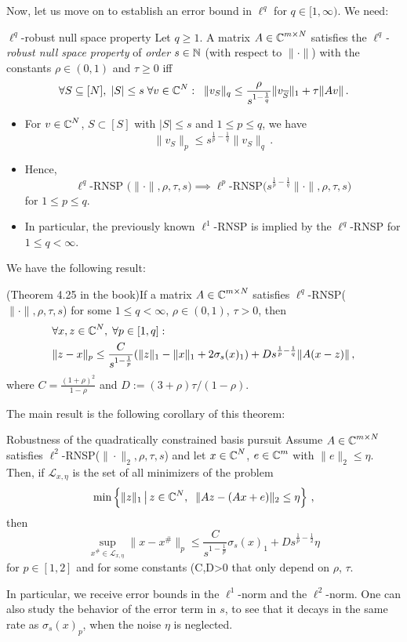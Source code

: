 \documentclass[a4paper]{article}
\begin{document}
    Now, let us move on to establish an error bound in \(\ell^q\) for \(q\in [1,\infty)\). We need:
    \begin{Def*}
 {$\ell^q$-robust null space property}{}
 Let \(q\ge 1\). A matrix \(A\in \operatorname{\mathbb C}^{m\times N}\) satisfies the \emph{$\ell^q$-robust null space property} of \emph{order} \(s\in \operatorname{\mathbb N}\) (with respect to \(\|\cdot\|\)) with the constants \(\rho\in (0,1)\) and \(\tau\ge0\) iff
 \[\forall S\subseteq [N],\;|S|\le s\;\forall v\in \operatorname{\mathbb C}^N:\;\;\|v_S\|_q\le \frac{\rho}{s^{1-\frac{1}{q}}}\|v_{\overline S}\|_1+\tau\|Av\|\,.\]
 \end{Def*}
 \begin{Bemerkung*}{}{}
     \begin{itemize}
		\item For \(v\in \operatorname{\mathbb C}^N \), \(S\subset [S]\) with \(|S|\le s\) and \(1\le p\le q\), we have 
		\[\|v_S\|_p\le s^{\frac{1}{p}-\frac{1}{q}}\|v_S\|_q\,.\]
		\item Hence, 
		\[
		\ell^q
		\text{-RNSP
		($\|\cdot\|,\rho,\tau,s$)}
		\implies \ell^p \text{-RNSP($s^{\frac{1}{p}-\frac{1}{q}}\|\cdot\|,\rho,\tau,s$)}
		\]
        for \(1\le p\le q\).
		\item In particular, the previously known \(\ell^1\)-RNSP is implied by the \(\ell^q\)-RNSP for \(1\le q<\infty\).
	\end{itemize}
 \end{Bemerkung*}    

 We have the following result:
 \begin{Satz*}
		{(Theorem 4.25 in the book)}{}If a matrix \(A\in \operatorname{\mathbb C}^{m\times N}\) satisfies \(\ell^q\)-RNSP($\|\cdot\|,\rho,\tau,s$) for some \(1\le q<\infty\), \(\rho\in (0,1)\), \(\tau>0\), then
		\begin{align*}
			&\forall x,z\in \operatorname{\mathbb C}^N,\;\forall p\in [1,q]:\\
			&\|z-x\|_p\le \frac{C}{s^{1-\frac{1}{p}}}(\|z\|_1-\|x\|_1+2\sigma_s(x)_1)+Ds^{\frac{1}{p}-\frac{1}{q}}\|A(x-z)\|\,,\\
		\end{align*}
		where \(C=\frac{(1+\rho)^2}{1-\rho}\) and \(D:=(3+\rho)\tau/(1-\rho)\).
	\end{Satz*}

   The main result is the following corollary of this theorem:
   \begin{Kor*}
		{Robustness of the quadratically constrained basis pursuit}{}
		Assume \(A\in \operatorname{\mathbb C}^{m\times N }\) satisfies \(\ell^2 \)-RNSP($\|\cdot\|_2,\rho,\tau, s$) and let \(x\in \operatorname{\mathbb C}^N\), \(e\in \operatorname{\mathbb C}^m\) with \(\|e\|_2\le \eta\). Then, if \(\mathcal L_{x,\eta}\) is the set of all minimizers of the problem
		\[\min\left\{\|z\|_1\,\big|\,z\in \operatorname{\mathbb C}^N,\;\;\|Az-(Ax+e)\|_2\le \eta\right\}\,,\]
		then
		\[\sup_{x^{\#}\in \mathcal L_{x,\eta}}\|x-x^{\#}\|_p\le \frac{C}{s^{1-\frac{1}{p}}}\sigma_s(x)_1+Ds^{\frac{1}{p}-\frac{1}{2}}\eta\]
		for \(p\in [1,2]\) and for some constants (C,D>0\) that only depend on \(\rho\), \(\tau\).
	\end{Kor*} 
In particular, we receive error bounds in the \(\ell^1\)-norm and the \(\ell^2\)-norm. One can also study the behavior of the error term in \(s\), to see that it decays in the same rate as \(\sigma_s(x)_p\), when the noise \(\eta\) is neglected.
\end{document}
